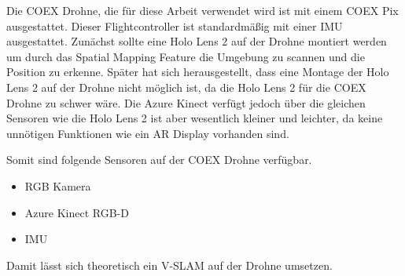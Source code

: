 Die COEX Drohne, die für diese Arbeit verwendet wird ist mit einem COEX Pix ausgestattet.
Dieser Flightcontroller ist standardmäßig mit einer IMU ausgestattet. Zunächst sollte eine Holo Lens 2 auf der Drohne montiert werden um durch das Spatial Mapping Feature die Umgebung zu scannen und die Position zu erkenne.
Später hat sich herausgestellt, dass eine Montage der Holo Lens 2 auf der Drohne nicht möglich ist, da die Holo Lens 2 für die COEX Drohne zu schwer wäre.
Die Azure Kinect verfügt jedoch über die gleichen Sensoren wie die Holo Lens 2 ist aber wesentlich kleiner und leichter, da keine unnötigen Funktionen wie ein \ac{AR} Display vorhanden sind.

Somit sind folgende Sensoren auf der COEX Drohne verfügbar.

\begin{itemize}
    \item{RGB Kamera}
    \item{Azure Kinect \ac{RGB-D}}
    \item{IMU}
\end{itemize}

Damit lässt sich theoretisch ein \ac{V-SLAM} auf der Drohne umsetzen.


